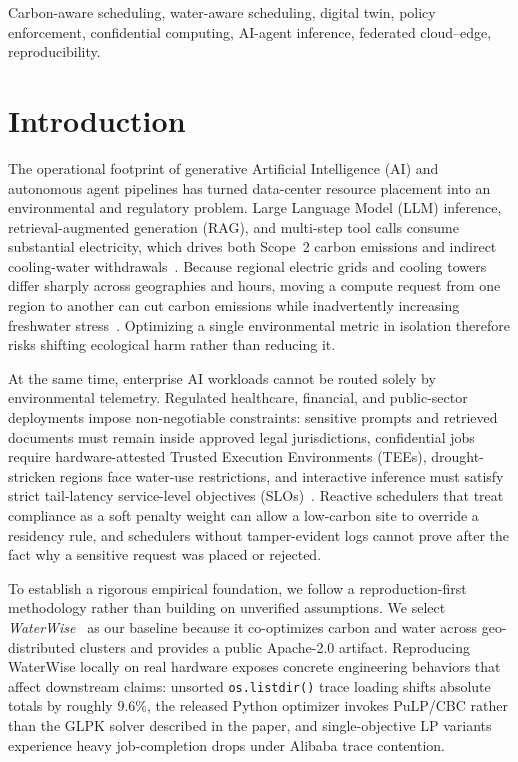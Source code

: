 \documentclass[conference]{IEEEtran}
\begin{document}
\begin{IEEEkeywords}
Carbon-aware scheduling, water-aware scheduling, digital twin, policy enforcement, confidential computing, AI-agent inference, federated cloud--edge, reproducibility.
\end{IEEEkeywords}

\section{Introduction}
\label{sec:intro}

The operational footprint of generative Artificial Intelligence (AI) and autonomous agent pipelines has turned data-center resource placement into an environmental and regulatory problem. Large Language Model (LLM) inference, retrieval-augmented generation (RAG), and multi-step tool calls consume substantial electricity, which drives both Scope~2 carbon emissions and indirect cooling-water withdrawals~\cite{li2025thirsty,moore2025llm}. Because regional electric grids and cooling towers differ sharply across geographies and hours, moving a compute request from one region to another can cut carbon emissions while inadvertently increasing freshwater stress~\cite{jiang2025waterwise,islam2015watch}. Optimizing a single environmental metric in isolation therefore risks shifting ecological harm rather than reducing it.

At the same time, enterprise AI workloads cannot be routed solely by environmental telemetry. Regulated healthcare, financial, and public-sector deployments impose non-negotiable constraints: sensitive prompts and retrieved documents must remain inside approved legal jurisdictions, confidential jobs require hardware-attested Trusted Execution Environments (TEEs), drought-stricken regions face water-use restrictions, and interactive inference must satisfy strict tail-latency service-level objectives (SLOs)~\cite{cloud2024tee,russinovich2021confidential}. Reactive schedulers that treat compliance as a soft penalty weight can allow a low-carbon site to override a residency rule, and schedulers without tamper-evident logs cannot prove after the fact why a sensitive request was placed or rejected.

To establish a rigorous empirical foundation, we follow a reproduction-first methodology rather than building on unverified assumptions. We select \textit{WaterWise}~\cite{jiang2025waterwise} as our baseline because it co-optimizes carbon and water across geo-distributed clusters and provides a public Apache-2.0 artifact. Reproducing WaterWise locally on real hardware exposes concrete engineering behaviors that affect downstream claims: unsorted \texttt{os.listdir()} trace loading shifts absolute totals by roughly 9.6\%, the released Python optimizer invokes PuLP/CBC rather than the GLPK solver described in the paper, and single-objective LP variants experience heavy job-completion drops under Alibaba trace contention.
\end{document}
